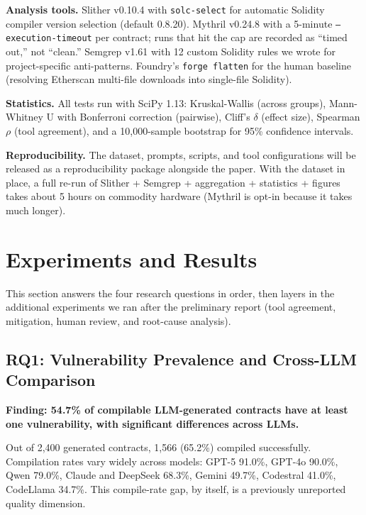 \documentclass[11pt]{article}
\begin{document}
\textbf{Analysis tools.} Slither v0.10.4 with \texttt{solc-select} for automatic Solidity compiler version selection (default 0.8.20). Mythril v0.24.8 with a 5-minute \texttt{--execution-timeout} per contract; runs that hit the cap are recorded as ``timed out,'' not ``clean.'' Semgrep v1.61 with 12 custom Solidity rules we wrote for project-specific anti-patterns. Foundry's \texttt{forge flatten} for the human baseline (resolving Etherscan multi-file downloads into single-file Solidity).

\textbf{Statistics.} All tests run with SciPy 1.13: Kruskal-Wallis (across groups), Mann-Whitney U with Bonferroni correction (pairwise), Cliff's $\delta$ (effect size), Spearman $\rho$ (tool agreement), and a 10,000-sample bootstrap for 95\% confidence intervals.

\textbf{Reproducibility.} The dataset, prompts, scripts, and tool configurations will be released as a reproducibility package alongside the paper. With the dataset in place, a full re-run of Slither + Semgrep + aggregation + statistics + figures takes about 5 hours on commodity hardware (Mythril is opt-in because it takes much longer).

\section{Experiments and Results}

This section answers the four research questions in order, then layers in the additional experiments we ran after the preliminary report (tool agreement, mitigation, human review, and root-cause analysis).

\subsection{RQ1: Vulnerability Prevalence and Cross-LLM Comparison}

\textbf{Finding: 54.7\% of compilable LLM-generated contracts have at least one vulnerability, with significant differences across LLMs.}

Out of 2,400 generated contracts, 1,566 (65.2\%) compiled successfully. Compilation rates vary widely across models: GPT-5 91.0\%, GPT-4o 90.0\%, Qwen 79.0\%, Claude and DeepSeek 68.3\%, Gemini 49.7\%, Codestral 41.0\%, CodeLlama 34.7\%. This compile-rate gap, by itself, is a previously unreported quality dimension.
\end{document}
